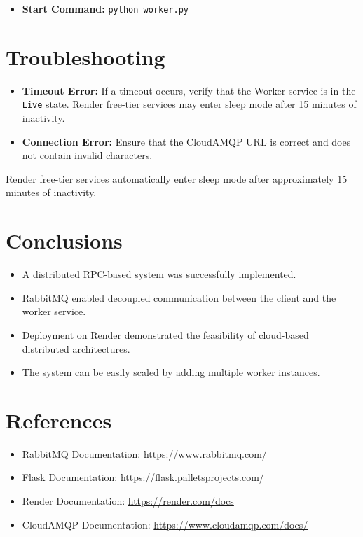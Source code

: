 \documentclass[12pt,a4paper]{article}
\begin{document}
\begin{itemize}
    \item \textbf{Start Command:} \texttt{python worker.py}
\end{itemize}

\section{Troubleshooting}

\begin{itemize}
    \item \textbf{Timeout Error:} If a timeout occurs, verify that the Worker service is in the \texttt{Live} state. Render free-tier services may enter sleep mode after 15 minutes of inactivity.
    
    \item \textbf{Connection Error:} Ensure that the CloudAMQP URL is correct and does not contain invalid characters.
\end{itemize}

\begin{tcolorbox}[colback=yellow!10]
Render free-tier services automatically enter sleep mode after approximately 15 minutes of inactivity.
\end{tcolorbox}

\section{Conclusions}

\begin{itemize}
    \item A distributed RPC-based system was successfully implemented.
    
    \item RabbitMQ enabled decoupled communication between the client and the worker service.
    
    \item Deployment on Render demonstrated the feasibility of cloud-based distributed architectures.
    
    \item The system can be easily scaled by adding multiple worker instances.
\end{itemize}

\section{References}

\begin{itemize}
    \item RabbitMQ Documentation: \url{https://www.rabbitmq.com/}
    
    \item Flask Documentation: \url{https://flask.palletsprojects.com/}
    
    \item Render Documentation: \url{https://render.com/docs}
    
    \item CloudAMQP Documentation: \url{https://www.cloudamqp.com/docs/}
\end{itemize}
\end{document}
